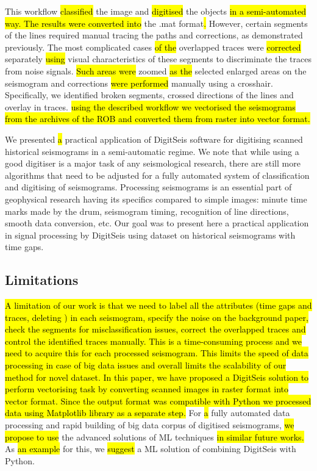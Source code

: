 \documentclass[sensors,article,submit,moreauthors,pdftex]{Definitions/mdpi}
\begin{document}
This workflow \hl{classified }the image and \hl{digitised }the objects \hl{in a semi-automated way. The results were converted into }the .mat format\hl{. }However, certain segments of the lines required manual tracing the paths and corrections, as demonstrated previously. The most complicated cases \hl{of the }overlapped traces\hl{ }were \hl{corrected} separately \hl{using }visual characteristics of these segments\hl{ }to discriminate the traces from noise signals. \hl{Such areas were }zoomed \hl{as the }selected enlarged areas on the seismogram and\hl{ }corrections \hl{were performed }manually using a crosshair. Specifically, we identified broken segments, crossed directions of the lines and overlay in traces. \hl{using the described workflow we vectorised the seismograms from the archives of the ROB and converted them from raster into vector format.}

We presented \hl{a} practical application of DigitSeis software for digitising scanned historical seismograms in a semi-automatic regime. We note that while using a good digitiser is a major task of any seismological research, there are still more algorithms that need to be adjusted for a fully automated system of classification and digitising of seismograms. Processing seismograms is an essential part of geophysical research having its specifics compared to simple images: minute time marks made by the drum, seismogram timing, recognition of line directions, smooth data conversion, etc. Our goal was to present here a practical application in signal processing by DigitSeis using dataset on historical seismograms with time gaps.

\subsection{Limitations}
\hl{A limitation of our work is that we need to label all the attributes (time gaps and traces, deleting ) in each seismogram, specify the noise on the background paper, check the segments for misclassification issues, correct the overlapped traces and control the identified traces manually. This is a time-consuming process and we need to acquire this for each processed seismogram. This limits the speed of data processing in case of big data issues and overall limits the scalability of our method for novel dataset. In this paper, we have proposed a DigitSeis solution to perform vectorising task by converting scanned images in raster format into vector format. Since the output format was compatible with Python we processed data using Matplotlib library as a separate step. }For \hl{a }fully automated data processing and rapid building of big data corpus of digitised seismograms, \hl{we propose to use }the advanced solutions of \ac{ML} techniques\hl{ in similar future works. }As \hl{an example }for this, we \hl{suggest} a \ac{ML} solution of combining DigitSeis with Python. 
\end{document}
